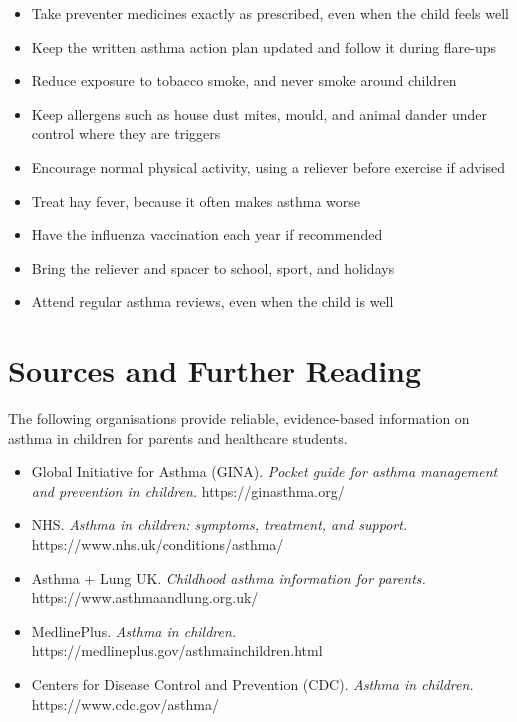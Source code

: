 \begin{itemize}
    \item Take preventer medicines exactly as prescribed, even when the child feels well
    \item Keep the written asthma action plan updated and follow it during flare-ups
    \item Reduce exposure to tobacco smoke, and never smoke around children
    \item Keep allergens such as house dust mites, mould, and animal dander under control where they are triggers
    \item Encourage normal physical activity, using a reliever before exercise if advised
    \item Treat hay fever, because it often makes asthma worse
    \item Have the influenza vaccination each year if recommended
    \item Bring the reliever and spacer to school, sport, and holidays
    \item Attend regular asthma reviews, even when the child is well
\end{itemize}

\section*{Sources and Further Reading}
The following organisations provide reliable, evidence-based information on asthma in children for parents and healthcare students.

\begin{itemize}
    \item Global Initiative for Asthma (GINA). \textit{Pocket guide for asthma management and prevention in children.} https://ginasthma.org/
    \item NHS. \textit{Asthma in children: symptoms, treatment, and support.} https://www.nhs.uk/conditions/asthma/
    \item Asthma + Lung UK. \textit{Childhood asthma information for parents.} https://www.asthmaandlung.org.uk/
    \item MedlinePlus. \textit{Asthma in children.} https://medlineplus.gov/asthmainchildren.html
    \item Centers for Disease Control and Prevention (CDC). \textit{Asthma in children.} https://www.cdc.gov/asthma/
\end{itemize}
